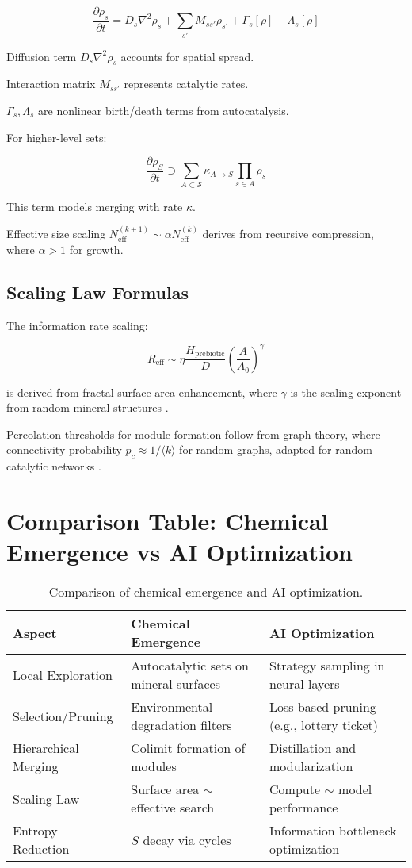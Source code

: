 \documentclass[openany]{book}
\begin{document}
\[\frac{\partial \rho_s}{\partial t} = D_s \nabla^2 \rho_s + \sum_{s'} M_{ss'} \rho_{s'} + \Gamma_s[\rho] - \Lambda_s[\rho]\]

Diffusion term $D_s \nabla^2 \rho_s$ accounts for spatial spread.

Interaction matrix $M_{ss'}$ represents catalytic rates.

$\Gamma_s, \Lambda_s$ are nonlinear birth/death terms from autocatalysis.

For higher-level sets:

\[\frac{\partial \rho_S}{\partial t} \supset \sum_{A \subset \mathcal{S}} \kappa_{A \to S} \prod_{s \in A} \rho_s\]

This term models merging with rate $\kappa$.

Effective size scaling $N_{\mathrm{eff}}^{(k+1)} \sim \alpha N_{\mathrm{eff}}^{(k)}$ derives from recursive compression, where $\alpha > 1$ for growth.

\section{Scaling Law Formulas}
The information rate scaling:

\[R_{\mathrm{eff}} \sim \eta \frac{H_{\mathrm{prebiotic}}}{D} \left( \frac{A}{A_0} \right)^\gamma\]

is derived from fractal surface area enhancement, where $\gamma$ is the scaling exponent from random mineral structures \citep{hazen2001}.

Percolation thresholds for module formation follow from graph theory, where connectivity probability $p_c \approx 1 / \langle k \rangle$ for random graphs, adapted for random catalytic networks \citep{hordijk2010}.

\chapter{Comparison Table: Chemical Emergence vs AI Optimization}
\begin{table}[h]
\centering
\begin{tabular}{lll}
\toprule
Aspect & Chemical Emergence & AI Optimization \\
\midrule
Local Exploration & Autocatalytic sets on mineral surfaces & Strategy sampling in neural layers \\
Selection/Pruning & Environmental degradation filters & Loss-based pruning (e.g., lottery ticket) \\
Hierarchical Merging & Colimit formation of modules & Distillation and modularization \\
Scaling Law & Surface area $\sim$ effective search & Compute $\sim$ model performance \\
Entropy Reduction & $S$ decay via cycles & Information bottleneck optimization \\
\bottomrule
\end{tabular}
\caption{Comparison of chemical emergence and AI optimization.}
\end{table}



\end{document}
